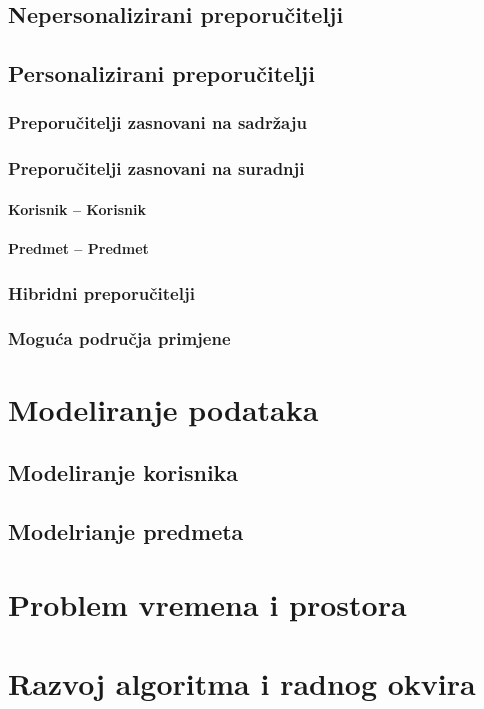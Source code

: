 \documentclass[times, utf8, diplomski]{fer}
\begin{document}
\section{Nepersonalizirani preporučitelji}
\section{Personalizirani preporučitelji}
\subsection{Preporučitelji zasnovani na sadržaju}
\subsection{Preporučitelji zasnovani na suradnji}
\subsubsection{Korisnik -- Korisnik}
\subsubsection{Predmet -- Predmet}

\subsection{Hibridni preporučitelji}
\subsection{Moguća područja primjene}

\chapter{Modeliranje podataka}
\section{Modeliranje korisnika}
\section{Modelrianje predmeta}

\chapter{Problem vremena i prostora}

\chapter{Razvoj algoritma i radnog okvira}
\end{document}
